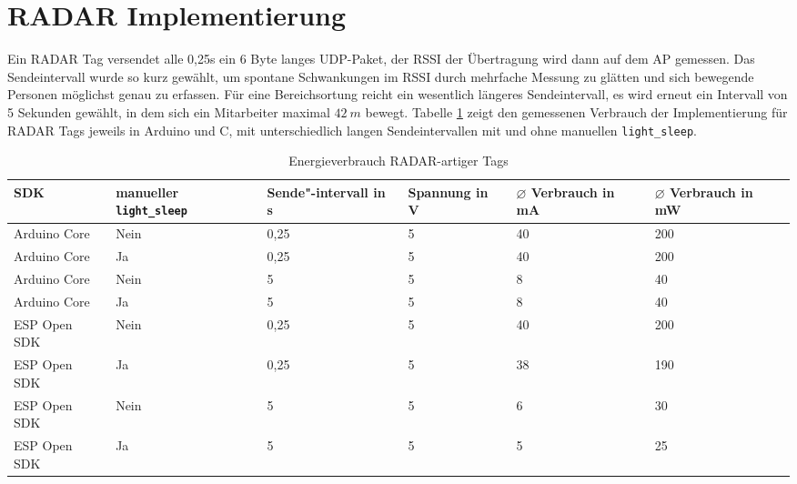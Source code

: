 \section{RADAR Implementierung}
Ein RADAR Tag versendet alle 0,25s ein 6 Byte langes UDP-Paket, der RSSI der Übertragung wird dann auf dem AP gemessen.
Das Sendeintervall wurde so kurz gewählt, um spontane Schwankungen im RSSI durch mehrfache Messung zu glätten und sich bewegende Personen möglichst genau zu erfassen.
Für eine Bereichsortung reicht ein wesentlich längeres Sendeintervall, es wird erneut ein Intervall von 5 Sekunden gewählt, in dem sich ein Mitarbeiter maximal $42\ m$ bewegt. 
Tabelle \ref{table:radarconsumption} zeigt den gemessenen Verbrauch der Implementierung für RADAR Tags jeweils in Arduino und C, mit unterschiedlich langen Sendeintervallen mit und ohne manuellen \texttt{light\_sleep}.

\begin{table}[h]
	\centering
	\caption{Energieverbrauch RADAR-artiger Tags}
	\label{table:radarconsumption}
	\begin{tabular}{p{3cm}|p{2.2cm}|p{1.5cm}|p{2cm}|p{2cm}|p{2cm}}
		SDK & manueller \texttt{light\_sleep} & Sende"-intervall in s & Spannung in V & $\varnothing$ Verbrauch in mA & $\varnothing$ Verbrauch in mW \\
		\hline
		Arduino Core & Nein & 0,25 & 5 & 40 & 200 \\
		Arduino Core & Ja & 0,25 & 5 & 40 & 200 \\
		Arduino Core & Nein & 5 & 5 & 8 & 40 \\
		Arduino Core & Ja & 5 & 5 & 8 & 40 \\
		ESP Open SDK & Nein & 0,25 & 5 & 40 & 200 \\
		ESP Open SDK & Ja & 0,25 & 5 & 38 & 190 \\
		ESP Open SDK & Nein & 5 & 5 & 6 & 30 \\
		ESP Open SDK & Ja & 5 & 5 & 5 & 25 \\
	\end{tabular}
\end{table}

